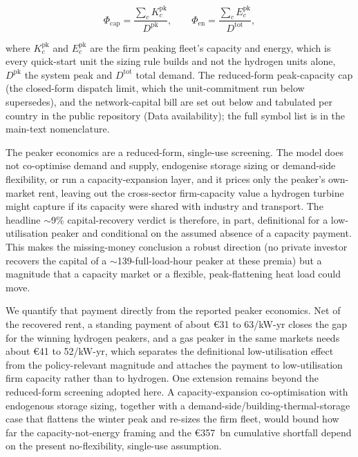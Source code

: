 \begin{equation}
\label{eq:share}
 \Phi_{\mathrm{cap}} = \frac{\sum_c K^{\mathrm{pk}}_{c}}{D^{\mathrm{pk}}},
 \qquad
 \Phi_{\mathrm{en}} = \frac{\sum_c E^{\mathrm{pk}}_{c}}{D^{\mathrm{tot}}},
\end{equation}

\noindent where $K^{\mathrm{pk}}_{c}$ and $E^{\mathrm{pk}}_{c}$ are the firm peaking
fleet's capacity and energy, which is every quick-start unit the sizing rule builds and
not the hydrogen units alone, $D^{\mathrm{pk}}$ the system peak and
$D^{\mathrm{tot}}$ total demand. The reduced-form peak-capacity cap (the closed-form
dispatch limit, which the unit-commitment run below supersedes), and the
network-capital bill are set out below and tabulated per country in
the public repository (Data availability); the full symbol list is in the main-text nomenclature.

The peaker economics are a reduced-form, single-use screening. The model does not
co-optimise demand and supply, endogenise storage sizing or demand-side flexibility, or
run a capacity-expansion layer, and it prices only the peaker's own-market rent, leaving
out the cross-sector firm-capacity value a hydrogen turbine might capture if its
capacity were shared with industry and transport. The headline $\sim$9\%
capital-recovery verdict is therefore, in part, definitional for a low-utilisation
peaker and conditional on the assumed absence of a capacity payment. This makes the missing-money conclusion a robust direction (no private
investor recovers the capital of a $\sim$139-full-load-hour peaker at these premia) but
a magnitude that a capacity market or a flexible, peak-flattening heat load could move.

We quantify that payment directly from the reported peaker economics. Net of the
recovered rent, a standing payment of about \euro{}31 to 63/kW-yr closes the gap for the
winning hydrogen peakers, and a gas peaker in the same markets needs about \euro{}41 to
52/kW-yr, which separates the definitional low-utilisation effect from the
policy-relevant magnitude and attaches the payment to low-utilisation firm capacity
rather than to hydrogen. One extension remains beyond the reduced-form screening adopted
here. A capacity-expansion co-optimisation with endogenous storage sizing, together with
a demand-side/building-thermal-storage case that flattens the winter peak and re-sizes
the firm fleet, would bound how far the capacity-not-energy framing and the
\euro{}357~bn cumulative shortfall depend on the present no-flexibility, single-use
assumption.


